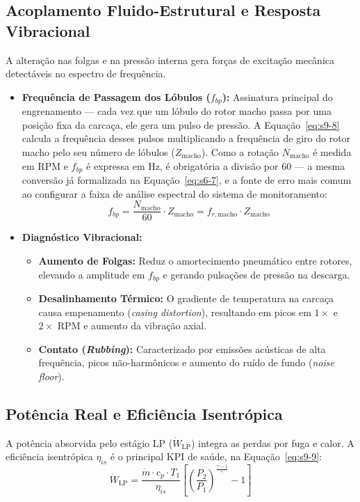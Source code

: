 \documentclass[12pt,a4paper]{article}
\numberwithin{equation}{section}
\numberwithin{table}{section}
\numberwithin{figure}{section}
\begin{document}
{	\subsection{\textbf{Acoplamento Fluido-Estrutural e Resposta Vibracional}}
	A alteração nas folgas e na pressão interna gera forças de excitação mecânica detectáveis no espectro de frequência.
	\begin{itemize}
		\item \textbf{Frequência de Passagem dos Lóbulos ($f_{bp}$):} Assinatura principal do engrenamento — cada vez que um lóbulo do rotor macho passa por uma posição fixa da carcaça, ele gera um pulso de pressão. A Equação~\eqref{eq:s9-8} calcula a frequência desses pulsos multiplicando a frequência de giro do rotor macho pelo seu número de lóbulos ($Z_{\text{macho}}$). Como a rotação $N_{\text{macho}}$ é medida em RPM e $f_{bp}$ é expressa em Hz, é obrigatória a divisão por 60 — a mesma conversão já formalizada na Equação~\eqref{eq:s6-7}, e a fonte de erro mais comum ao configurar a faixa de análise espectral do sistema de monitoramento:
		\begin{equation}\label{eq:s9-8}
 f_{bp} = \frac{N_{\text{macho}}}{60} \cdot Z_{\text{macho}} = f_{r,\text{macho}} \cdot Z_{\text{macho}}
\end{equation}
		\item \textbf{Diagnóstico Vibracional:}
		\begin{itemize}
			\item \textbf{Aumento de Folgas:} Reduz o amortecimento pneumático entre rotores, elevando a amplitude em $f_{bp}$ e gerando pulsações de pressão na descarga.
			\item \textbf{Desalinhamento Térmico:} O gradiente de temperatura na carcaça causa empenamento (\textit{casing distortion}), resultando em picos em $1 \times$ e $2 \times$ RPM e aumento da vibração axial.
			\item \textbf{Contato (\textit{Rubbing}):} Caracterizado por emissões acústicas de alta frequência, picos não-harmônicos e aumento do ruído de fundo (\textit{noise floor}).
		\end{itemize}
	\end{itemize}
	
	\subsection{\textbf{Potência Real e Eficiência Isentrópica}}
	A potência absorvida pelo estágio LP ($\dot{W}_{\text{LP}}$) integra as perdas por fuga e calor. A eficiência isentrópica $\eta_{is}$ é o principal KPI de saúde, na Equação~\eqref{eq:s9-9}:
	\begin{equation}\label{eq:s9-9}
 \dot{W}_{\text{LP}} = \frac{\dot{m} \cdot c_p \cdot T_1}{\eta_{is}} \left[ \left( \frac{P_2}{P_1} \right)^{\frac{\gamma - 1}{\gamma}} - 1 \right] 
\end{equation}
	
}
\end{document}
